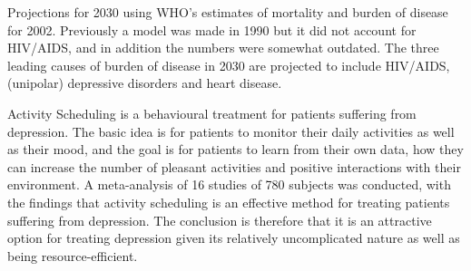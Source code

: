 
Projections for 2030 using WHO’s estimates of mortality and  burden of disease for 2002. Previously a model was made in 1990 but it did not account for HIV/AIDS, and in addition the numbers were somewhat outdated. The  three leading causes of burden of disease in 2030 are projected to include HIV/AIDS, (unipolar) depressive disorders and heart disease. 

Activity Scheduling is a behavioural treatment for patients suffering from depression. The basic idea is for patients to monitor their daily activities as well as their mood, and the goal is for patients to learn from their own data, how they can increase the number of pleasant activities and positive interactions with their environment. A meta-analysis of 16 studies of 780 subjects was conducted, with the findings that activity scheduling is an effective method for treating patients suffering from depression. The conclusion is therefore that it is an attractive option for treating depression given its relatively uncomplicated nature as well as being resource-efficient. 

